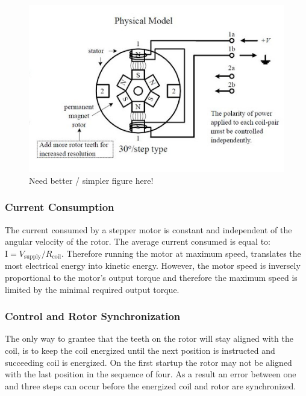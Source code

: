 \begin{figure}
	\centering
	\includegraphics[width=\textwidth]{pics/bipolar_stepper.png}
	\caption{Need better / simpler figure here!}
	\label{fig:bipolarstepper}
\end{figure}

\subsubsection{Current Consumption}
The current consumed by a stepper motor is constant and independent of the angular velocity of the rotor.
The average current consumed is equal to: $\textrm{I} = V_{\text{supply}}/R_{\text{coil}}$.
Therefore running the motor at maximum speed, translates the most electrical energy into kinetic energy.
However, the motor speed is inversely proportional to the motor's output torque and therefore the maximum speed is limited by the minimal required output torque.

\subsubsection{Control and Rotor Synchronization}

The only way to grantee that the teeth on the rotor will stay aligned with the coil, is to keep the coil energized until the next position is instructed and succeeding coil is energized. 
On the first startup the rotor may not be aligned with the last position in the sequence of four.
As a result an error between one and three steps can occur before the energized coil and rotor are synchronized.

